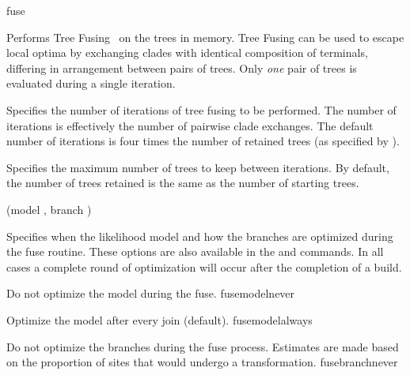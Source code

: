 \begin{command}{fuse}{}


    \begin{poydescription}
            Performs Tree Fusing~\cite{goloboff1999} on the trees in memory.  
            Tree Fusing  can be used to escape local optima
            by exchanging clades with identical composition of terminals, differing in arrangement
            between pairs of trees. Only \emph{one} pair of trees is evaluated during a single iteration.
    \end{poydescription}

    \begin{arguments}
            {Specifies the number of iterations of tree fusing to be performed. The
            number of iterations is effectively the number of pairwise clade exchanges. 
            The default number of iterations is four times the number of retained
            trees (as specified by ).}
            {}

            {Specifies the maximum number of trees to keep between iterations.
            By default, the number of trees retained is the same as the number
            of starting trees.}
            {}
                  
          {(model \optional {\poylident}, branch \optional {\poylident})}
            {Specifies when the likelihood model and how the branches are
            optimized during the fuse routine. These options are also available
            in the  and  commands. In all
            cases a complete round of optimization will occur after the
            completion of a build.

            \begin{description}

                    {Do not optimize the model during the fuse.}
                    {fusemodelnever}

                    {Optimize the model after every join (default).}
                    {fusemodelalways}

                    {Do not optimize the branches during the fuse process.
                    Estimates are made based on the proportion of sites that
                    would undergo a transformation.}
                    {fusebranchnever}


\end{description}}
\end{arguments}
\end{command}
